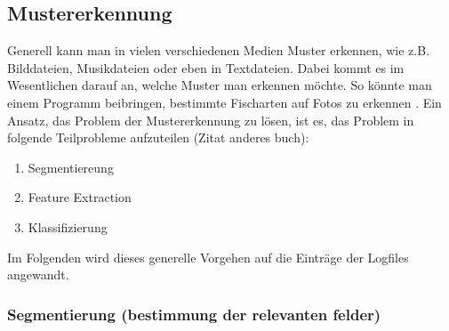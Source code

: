 \subsection{Mustererkennung}
\label{sub:Mustererkennung}
	Generell kann man in vielen verschiedenen Medien Muster erkennen, wie z.B. Bilddateien, Musikdateien oder eben in Textdateien. Dabei kommt es im Wesentlichen darauf an, welche Muster man erkennen möchte. So könnte man einem Programm beibringen, bestimmte Fischarten auf Fotos zu erkennen \citep{DuHaSt01}. Ein Ansatz, das Problem der Mustererkennung zu lösen, ist es, das Problem in folgende Teilprobleme aufzuteilen (Zitat anderes buch):
\begin{enumerate}
	\item Segmentiereung
	\item Feature Extraction
	\item Klassifizierung
\end{enumerate}
Im Folgenden wird dieses generelle Vorgehen auf die Einträge der Logfiles angewandt.

\subsubsection{Segmentierung (bestimmung der relevanten felder)}
\label{ssub:Segmentierung}

